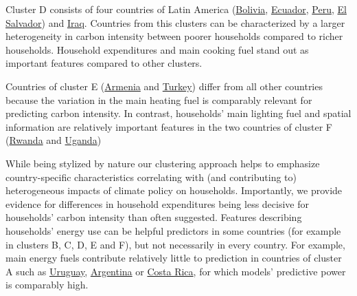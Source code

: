 \documentclass[12pt, a4paper]{article}
\begin{document}
Cluster D consists of four countries of Latin America (\hyperref[fig:5b_BOL]{Bolivia}, \hyperref[fig:5b_ECU]{Ecuador}, \hyperref[fig:5b_PER]{Peru}, \hyperref[fig:5b_SLV]{El Salvador}) and \hyperref[fig:5b_IRQ]{Iraq}. Countries from this clusters can be characterized by a larger heterogeneity in carbon intensity between poorer households compared to richer households. Household expenditures and main cooking fuel stand out as important features compared to other clusters. 

Countries of cluster E (\hyperref[fig:5b_ARM]{Armenia} and \hyperref[fig:5b_TUR]{Turkey}) differ from all other countries because the variation in the main heating fuel is comparably relevant for predicting carbon intensity. In contrast, households' main lighting fuel and spatial information are relatively important features in the two countries of cluster F (\hyperref[fig:5b_RWA]{Rwanda} and \hyperref[fig:5b_UGA]{Uganda})

While being stylized by nature our clustering approach helps to emphasize country-specific characteristics correlating with (and contributing to) heterogeneous impacts of climate policy on households. Importantly, we provide evidence for differences in household expenditures being less decisive for households' carbon intensity than often suggested. Features describing households' energy use can be helpful predictors in some countries (for example in clusters B, C, D, E and F), but not necessarily in every country. For example, main energy fuels contribute relatively little to prediction in countries of cluster A such as \hyperref[fig:5b_URY]{Uruguay}, \hyperref[fig:5b_URY]{Argentina} or \hyperref[fig:5b_CRI]{Costa Rica}, for which models' predictive power is comparably high.
\end{document}
